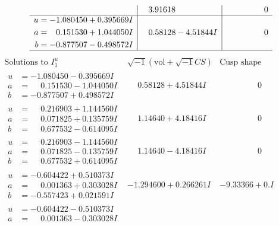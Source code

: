 \documentclass[1p]{elsarticle_modified}
\theoremstyle{definition}
\newcommand{\I}{\sqrt{-1}}
\begin{document}
$$\begin{array}{c|c|c}
 & \phantom{-}3.91618\phantom{ +0.000000I} & \phantom{-0.000000 } 0 \\ \hline\begin{aligned}
u &= -1.080450 + 0.395669 I \\
a &= \phantom{-}0.151530 + 1.044050 I \\
b &= -0.877507 - 0.498572 I\end{aligned}
 & \phantom{-}0.58128 - 4.51844 I & \phantom{-0.000000 } 0\\
 \hline 
 \end{array}$$\newpage$$\begin{array}{c|c|c}  
\text{Solutions to }I^u_{1}& \I (\text{vol} + \sqrt{-1}CS) & \text{Cusp shape}\\
 \hline 
\begin{aligned}
u &= -1.080450 - 0.395669 I \\
a &= \phantom{-}0.151530 - 1.044050 I \\
b &= -0.877507 + 0.498572 I\end{aligned}
 & \phantom{-}0.58128 + 4.51844 I & \phantom{-0.000000 } 0 \\ \hline\begin{aligned}
u &= \phantom{-}0.216903 + 1.144560 I \\
a &= \phantom{-}0.071825 + 0.135759 I \\
b &= \phantom{-}0.677532 - 0.614095 I\end{aligned}
 & \phantom{-}1.14640 + 4.18416 I & \phantom{-0.000000 } 0 \\ \hline\begin{aligned}
u &= \phantom{-}0.216903 - 1.144560 I \\
a &= \phantom{-}0.071825 - 0.135759 I \\
b &= \phantom{-}0.677532 + 0.614095 I\end{aligned}
 & \phantom{-}1.14640 - 4.18416 I & \phantom{-0.000000 } 0 \\ \hline\begin{aligned}
u &= -0.604422 + 0.510373 I \\
a &= \phantom{-}0.001363 + 0.303028 I \\
b &= -0.557423 + 0.021591 I\end{aligned}
 & -1.294600 + 0.266261 I & -9.33366 + 0. I\phantom{ +0.000000I} \\ \hline\begin{aligned}
u &= -0.604422 - 0.510373 I \\
a &= \phantom{-}0.001363 - 0.303028 I \\

\end{aligned}
\end{array}$$
\end{document}
